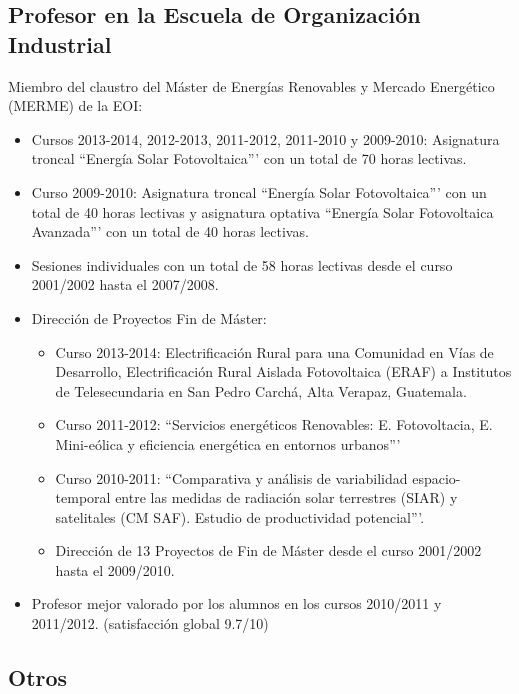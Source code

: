 \documentclass[article, a4paper]{memoir}
\begin{document}
\subsection{Profesor en la Escuela de Organización Industrial}
\label{sec-3-2}

Miembro del claustro del Máster de Energías Renovables y Mercado Energético (MERME) de la EOI:

\begin{itemize}
\item Cursos 2013-2014, 2012-2013, 2011-2012, 2011-2010 y 2009-2010:
Asignatura troncal ``Energía Solar Fotovoltaica''' con un total de 70
horas lectivas.

\item Curso 2009-2010: Asignatura troncal ``Energía Solar Fotovoltaica'''
con un total de 40 horas lectivas y asignatura optativa ``Energía
Solar Fotovoltaica Avanzada''' con un total de 40 horas lectivas.

\item Sesiones individuales con un total de 58 horas lectivas desde el
curso 2001/2002 hasta el 2007/2008.

\item Dirección de Proyectos Fin de Máster:
\begin{itemize}
\item Curso 2013-2014: \guillemotleft{}Electrificación Rural para una Comunidad en Vías
de Desarrollo\guillemotright{}, \guillemotleft{}Electrificación Rural Aislada Fotovoltaica (ERAF)
a Institutos de Telesecundaria en San Pedro Carchá, Alta Verapaz,
Guatemala.\guillemotright{}
\item Curso 2011-2012: ``Servicios energéticos Renovables:
E. Fotovoltacia, E. Mini-eólica y eficiencia energética en
entornos urbanos'''
\item Curso 2010-2011: ``Comparativa y análisis de variabilidad
espacio-temporal entre las medidas de radiación solar terrestres
(SIAR) y satelitales (CM SAF). Estudio de productividad
potencial'''.
\item Dirección de 13 Proyectos de Fin de Máster desde el curso
2001/2002 hasta el 2009/2010.
\end{itemize}

\item Profesor mejor valorado por los alumnos en los cursos 2010/2011
y 2011/2012. (satisfacción global 9.7/10)
\end{itemize}


\subsection{Otros}
\label{sec-3-3}
\end{document}
